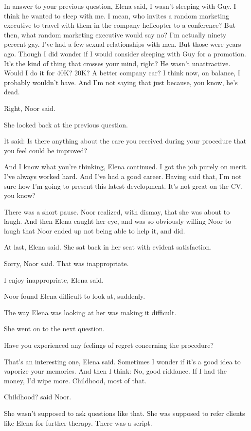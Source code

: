 \documentclass[12pt,a5paper]{book}
\begin{document}
In answer to your previous question, Elena said, I wasn't sleeping with Guy. I think he wanted to sleep with me. I mean, who invites a random marketing executive to travel with them in the company helicopter to a conference? But then, what random marketing executive would say no? I'm actually ninety percent gay. I've had a few sexual relationships with men. But those were years ago. Though I did wonder if I would consider sleeping with Guy for a promotion. It's the kind of thing that crosses your mind, right? He wasn't unattractive. Would I do it for 40K? 20K? A better company car? I think now, on balance, I probably wouldn't have. And I'm not saying that just because, you know, he's dead.

Right, Noor said.

She looked back at the previous question.

It said: Is there anything about the care you received during your procedure that you feel could be improved?

And I know what you're thinking, Elena continued. I got the job purely on merit. I've always worked hard. And I've had a good career. Having said that, I'm not sure how I'm going to present this latest development. It's not great on the CV, you know?

There was a short pause. Noor realized, with dismay, that she was about to laugh. And then Elena caught her eye, and was so obviously willing Noor to laugh that Noor ended up not being able to help it, and did.

At last, Elena said. She sat back in her seat with evident satisfaction.

Sorry, Noor said. That was inappropriate.

I enjoy inappropriate, Elena said.

Noor found Elena difficult to look at, suddenly.

The way Elena was looking at her was making it difficult.

She went on to the next question.

Have you experienced any feelings of regret concerning the procedure?

That's an interesting one, Elena said. Sometimes I wonder if it's a good idea to vaporize your memories. And then I think: No, good riddance. If I had the money, I'd wipe more. Childhood, most of that.

Childhood? said Noor.

She wasn't supposed to ask questions like that. She was supposed to refer clients like Elena for further therapy. There was a script.
\end{document}

